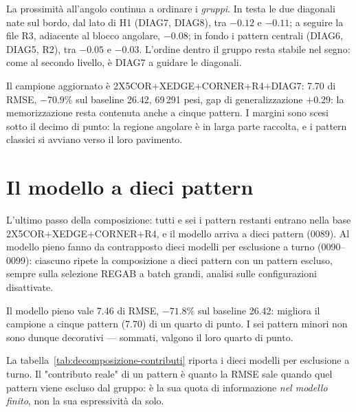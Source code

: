 La prossimità all'angolo continua a ordinare i \emph{gruppi}. In
testa le due diagonali nate sul bordo, dal lato di H1 (DIAG7,
DIAG8), tra $-0.12$ e $-0.11$; a seguire la file R3, adiacente al
blocco angolare, $-0.08$; in fondo i pattern centrali (DIAG6,
DIAG5, R2), tra $-0.05$ e $-0.03$. L'ordine dentro il gruppo resta
stabile nel segno: come al secondo livello, è DIAG7 a guidare le
diagonali.

Il campione aggiornato è 2X5COR+XEDGE+CORNER+R4+DIAG7: 7.70 di
RMSE, $-70.9\%$ sul baseline 26.42, 69\,291 pesi, gap di
generalizzazione $+0.29$: la memorizzazione resta contenuta anche a
cinque pattern. I margini sono scesi sotto il decimo di punto: la
regione angolare è in larga parte raccolta, e i pattern classici si
avviano verso il loro pavimento.

\section{Il modello a dieci pattern}

L'ultimo passo della composizione: tutti e sei i pattern restanti
entrano nella base 2X5COR+XEDGE+CORNER+R4, e il modello arriva a
dieci pattern (0089). Al modello pieno fanno da contrapposto dieci
modelli per esclusione a turno (0090--0099): ciascuno ripete la
composizione a dieci pattern con un pattern escluso, sempre sulla
selezione REGAB a batch grandi, analisi sulle configurazioni
disattivate.

Il modello pieno vale 7.46 di RMSE, $-71.8\%$ sul baseline 26.42:
migliora il campione a cinque pattern (7.70) di un quarto di
punto. I sei pattern minori non sono dunque decorativi — sommati,
valgono il loro quarto di punto.

La tabella~\ref{tab:decomposizione-contributi} riporta i dieci
modelli per esclusione a turno. Il "contributo reale" di un
pattern è quanto la RMSE sale quando quel pattern viene escluso
dal gruppo: è la sua quota di informazione \emph{nel modello
finito}, non la sua espressività da solo.

